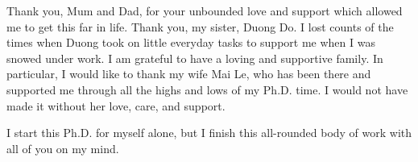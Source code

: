 \begin{acknowledgements}
    
    Thank you, Mum and Dad, for your unbounded love and support which allowed me to get this far in life. Thank you, my sister, Duong Do. I lost counts of the times when Duong took on little everyday tasks to support me when I was snowed under work. I am grateful to have a loving and supportive family. In particular, I would like to thank my wife Mai Le, who has been there and supported me through all the highs and lows of my Ph.D. time. I would not have made it without her love, care, and support. 
    
    
    I start this Ph.D. for myself alone, but I finish this all-rounded body of work with all of you on my mind.
    

\end{acknowledgements}